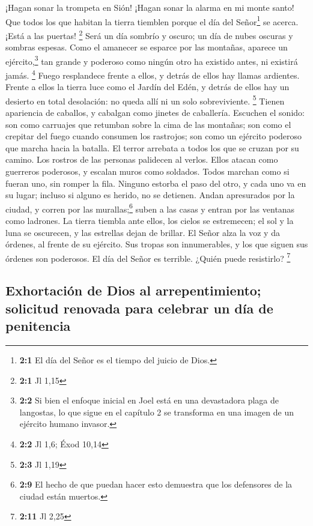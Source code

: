  ¡Hagan sonar la trompeta en Sión! ¡Hagan sonar la alarma
en mi monte santo! Que todos los que habitan la tierra tiemblen porque
el día del Señor\footnote{\textbf{2:1} El día del Señor es el tiempo del
  juicio de Dios.} se acerca. ¡Está a las puertas! \footnote{\textbf{2:1}
  Jl 1,15}  Será un día sombrío y oscuro; un día de nubes
oscuras y sombras espesas. Como el amanecer se esparce por las montañas,
aparece un ejército,\footnote{\textbf{2:2} Si bien el enfoque inicial en
  Joel está en una devastadora plaga de langostas, lo que sigue en el
  capítulo 2 se transforma en una imagen de un ejército humano invasor.}
tan grande y poderoso como ningún otro ha existido antes, ni existirá
jamás. \footnote{\textbf{2:2} Jl 1,6; Éxod 10,14}  Fuego
resplandece frente a ellos, y detrás de ellos hay llamas ardientes.
Frente a ellos la tierra luce como el Jardín del Edén, y detrás de ellos
hay un desierto en total desolación: no queda allí ni un solo
sobreviviente. \footnote{\textbf{2:3} Jl 1,19}  Tienen
apariencia de caballos, y cabalgan como jinetes de caballería.
 Escuchen el sonido: son como carruajes que retumban sobre
la cima de las montañas; son como el crepitar del fuego cuando consumen
los rastrojos; son como un ejército poderoso que marcha hacia la
batalla.  El terror arrebata a todos los que se cruzan por
su camino. Los rostros de las personas palidecen al verlos.
 Ellos atacan como guerreros poderosos, y escalan muros
como soldados. Todos marchan como si fueran uno, sin romper la fila.
 Ninguno estorba el paso del otro, y cada uno va en su
lugar; incluso si alguno es herido, no se detienen.  Andan
apresurados por la ciudad, y corren por las murallas;\footnote{\textbf{2:9}
  El hecho de que puedan hacer esto demuestra que los defensores de la
  ciudad están muertos.} suben a las casas y entran por las ventanas
como ladrones.  La tierra tiembla ante ellos, los cielos
se estremecen; el sol y la luna se oscurecen, y las estrellas dejan de
brillar.  El Señor alza la voz y da órdenes, al frente de
su ejército. Sus tropas son innumerables, y los que siguen sus órdenes
son poderosos. El día del Señor es terrible. ¿Quién puede resistirlo?
\footnote{\textbf{2:11} Jl 2,25}

\hypertarget{exhortaciuxf3n-de-dios-al-arrepentimiento-solicitud-renovada-para-celebrar-un-duxeda-de-penitencia}{%
\subsection{Exhortación de Dios al arrepentimiento; solicitud renovada
para celebrar un día de
penitencia}\label{exhortaciuxf3n-de-dios-al-arrepentimiento-solicitud-renovada-para-celebrar-un-duxeda-de-penitencia}}


